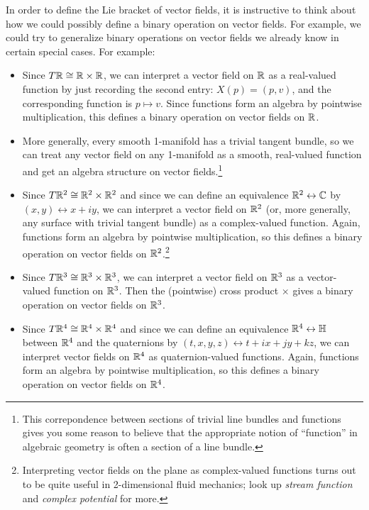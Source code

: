 In order to define the Lie bracket of vector fields, it is instructive to think about how we could possibly define a binary operation on vector fields. For example, we could try to generalize binary operations on vector fields we already know in certain special cases. For example:
\begin{itemize}
	\item Since $T\mathbb{R} \cong \mathbb{R} \times \mathbb{R}$, we can interpret a vector field on $\mathbb{R}$ as a real-valued function by just recording the second entry: $X(p) = (p,v)$, and the corresponding function is $p \mapsto v$. Since functions form an algebra by pointwise multiplication, this defines a binary operation on vector fields on $\mathbb{R}$.
	
	\item More generally, every smooth 1-manifold has a trivial tangent bundle, so we can treat any vector field on any 1-manifold as a smooth, real-valued function and get an algebra structure on vector fields.\footnote{This correpondence between sections of trivial line bundles and functions gives you some reason to believe that the appropriate notion of ``function'' in algebraic geometry is often a section of a line bundle.}
	
	\item Since $T \mathbb{R}^2 \cong \mathbb{R}^2 \times \mathbb{R}^2$ and since we can define an equivalence $\mathbb{R}^2 \leftrightarrow \mathbb{C}$ by $(x,y) \leftrightarrow x + iy$, we can interpret a vector field on $\mathbb{R}^2$ (or, more generally, any surface with trivial tangent bundle) as a complex-valued function. Again, functions form an algebra by pointwise multiplication, so this defines a binary operation on vector fields on $\mathbb{R}^2$.\footnote{Interpreting vector fields on the plane as complex-valued functions turns out to be quite useful in 2-dimensional fluid mechanics; look up \emph{stream function} and \emph{complex potential} for more.}
	
	\item Since $T\mathbb{R}^3 \cong \mathbb{R}^3 \times \mathbb{R}^3$, we can interpret a vector field on $\mathbb{R}^3$ as a vector-valued function on $\mathbb{R}^3$. Then the (pointwise) cross product $\times$ gives a binary operation on vector fields on $\mathbb{R}^3$.
	
	\item Since $T\mathbb{R}^4 \cong \mathbb{R}^4 \times \mathbb{R}^4$ and since we can define an equivalence $\mathbb{R}^4 \leftrightarrow \mathbb{H}$ between $\mathbb{R}^4$ and the quaternions by $(t,x,y,z) \leftrightarrow t +i x + j y + kz$, we can interpret vector fields on $\mathbb{R}^4$ as quaternion-valued functions. Again, functions form an algebra by pointwise multiplication, so this defines a binary operation on vector fields on $\mathbb{R}^4$. 
	

\end{itemize}
